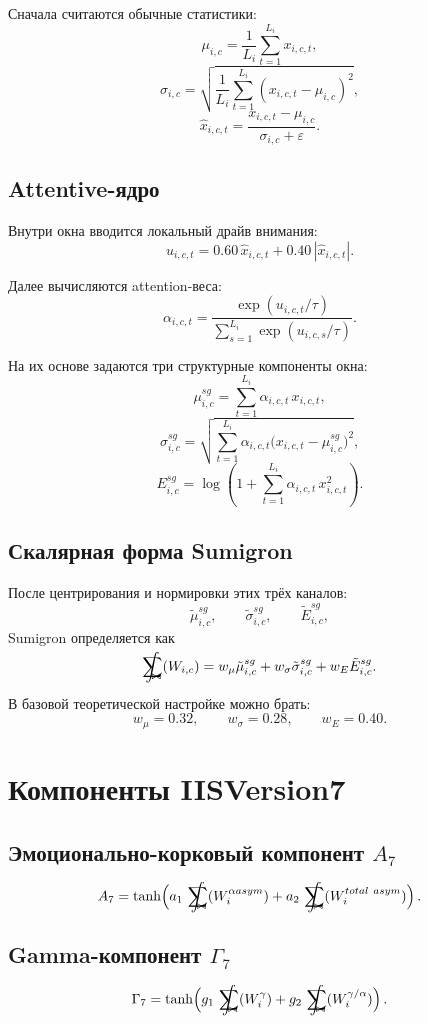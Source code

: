 \documentclass[12pt,a4paper]{article}
\newcommand{\sgsumintright}[1]{\mathop{\mathchoice
  {\ooalign{
    \hfil$\displaystyle\sum$\hfil\cr
    \hfil$\displaystyle\int$\hfil\cr
    \hidewidth\raisebox{-1.35ex}{\kern1.25ex$\scriptstyle #1$}\hidewidth\cr
  }}
  {\ooalign{
    \hfil$\textstyle\sum$\hfil\cr
    \hfil$\textstyle\int$\hfil\cr
    \hidewidth\raisebox{-1.00ex}{\kern1.00ex$\scriptscriptstyle #1$}\hidewidth\cr
  }}
  {\ooalign{
    \hfil$\scriptstyle\sum$\hfil\cr
    \hfil$\scriptstyle\int$\hfil\cr
    \hidewidth\raisebox{-0.75ex}{\kern0.75ex$\scriptscriptstyle #1$}\hidewidth\cr
  }}
  {\ooalign{
    \hfil$\scriptscriptstyle\sum$\hfil\cr
    \hfil$\scriptscriptstyle\int$\hfil\cr
    \hidewidth\raisebox{-0.60ex}{\kern0.55ex$\scriptscriptstyle #1$}\hidewidth\cr
  }}
}}
\newcommand{\sgop}{\sgsumintright{\bowtie}}
\begin{document}
Сначала считаются обычные статистики:
\[
\mu_{i,c}=\frac{1}{L_i}\sum_{t=1}^{L_i}x_{i,c,t},
\]
\[
\sigma_{i,c}=\sqrt{\frac{1}{L_i}\sum_{t=1}^{L_i}(x_{i,c,t}-\mu_{i,c})^2},
\]
\[
\hat{x}_{i,c,t}=\frac{x_{i,c,t}-\mu_{i,c}}{\sigma_{i,c}+\varepsilon}.
\]

\subsection{Attentive-ядро}
Внутри окна вводится локальный драйв внимания:
\[
u_{i,c,t}=0.60\,\hat{x}_{i,c,t}+0.40\,|\hat{x}_{i,c,t}|.
\]

Далее вычисляются attention-веса:
\[
\alpha_{i,c,t}=
\frac{\exp(u_{i,c,t}/\tau)}
{\sum_{s=1}^{L_i}\exp(u_{i,c,s}/\tau)}.
\]

На их основе задаются три структурные компоненты окна:
\[
\mu^{sg}_{i,c}=\sum_{t=1}^{L_i}\alpha_{i,c,t}\,x_{i,c,t},
\]
\[
\sigma^{sg}_{i,c}=
\sqrt{
\sum_{t=1}^{L_i}\alpha_{i,c,t}
\bigl(x_{i,c,t}-\mu^{sg}_{i,c}\bigr)^2
},
\]
\[
E^{sg}_{i,c}=
\log\!\left(
1+\sum_{t=1}^{L_i}\alpha_{i,c,t}\,x_{i,c,t}^2
\right).
\]

\subsection{Скалярная форма Sumigron}
После центрирования и нормировки этих трёх каналов:
\[
\tilde{\mu}^{sg}_{i,c},\qquad
\tilde{\sigma}^{sg}_{i,c},\qquad
\tilde{E}^{sg}_{i,c},
\]
Sumigron определяется как
\[
\sgop(W_{i,c})=
w_\mu \tilde{\mu}^{sg}_{i,c}
+w_\sigma \tilde{\sigma}^{sg}_{i,c}
+w_E \tilde{E}^{sg}_{i,c}.
\]

В базовой теоретической настройке можно брать:
\[
w_\mu=0.32,\qquad
w_\sigma=0.28,\qquad
w_E=0.40.
\]

\section{Компоненты IISVersion7}
\subsection{Эмоционально-корковый компонент \(A_7\)}
\[
A_7=
\tanh\!\left(
a_1\,\sgop(W^{\alpha asym}_i)
+a_2\,\sgop(W^{total\ asym}_i)
\right).
\]

\subsection{Gamma-компонент \(\Gamma_7\)}
\[
\Gamma_7=
\tanh\!\left(
g_1\,\sgop(W^\gamma_i)
+g_2\,\sgop(W^{\gamma/\alpha}_i)
\right).
\]
\end{document}

